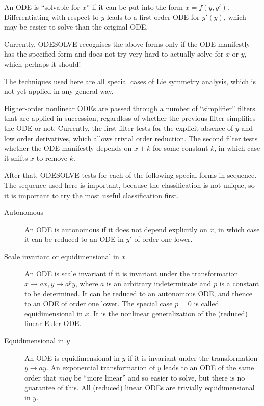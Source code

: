 An ODE is ``solvable for $x$'' if it can be put into the form $x =
f(y,y')$.  Differentiating with respect to $y$ leads to a first-order
ODE for $y'(y)$, which may be easier to solve than the original ODE.

Currently, ODESOLVE recognises the above forms only if the ODE
manifestly has the specified form and does not try very hard to
actually solve for $x$ or $y$, which perhaps it should!



The techniques used here are all special cases of Lie symmetry
analysis, which is not yet applied in any general way.

Higher-order nonlinear ODEs are passed through a number of
``simplifier'' filters that are applied in succession, regardless of
whether the previous filter simplifies the ODE or not.  Currently, the
first filter tests for the explicit absence of $y$ and low order
derivatives, which allows trivial order reduction.  The second filter
tests whether the ODE manifestly depends on $x+k$ for some constant
$k$, in which case it shifts $x$ to remove $k$.

After that, ODESOLVE tests for each of the following special
forms in sequence.  The sequence used here is important, because the
classification is not unique, so it is important to try the most
useful classification first.
\begin{description}
\item[Autonomous] An ODE is autonomous if it does not depend
explicitly on $x$, in which case it can be reduced to an ODE in $y'$
of order one lower.

\item[Scale invariant or equidimensional in $x$] An ODE is scale
invariant if it is invariant under the transformation $x \to ax, y \to
a^py$, where $a$ is an arbitrary indeterminate and $p$ is a constant
to be determined.  It can be reduced to an autonomous ODE, and thence
to an ODE of order one lower.  The special case $p = 0$ is called
equidimensional in $x$.  It is the nonlinear generalization of the
(reduced) linear Euler ODE.

\item[Equidimensional in $y$] An ODE is equidimensional in $y$ if it
is invariant under the transformation $y \to ay$.  An exponential
transformation of $y$ leads to an ODE of the same order that
\emph{may} be ``more linear'' and so easier to solve, but there is no
guarantee of this.  All (reduced) linear ODEs are trivially
equidimensional in $y$.
\end{description}

